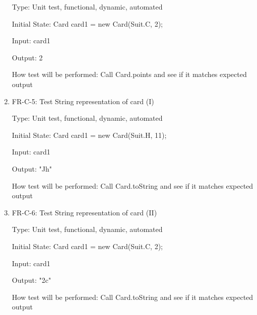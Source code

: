 \documentclass[12pt, titlepage]{article}
\begin{document}
\begin{enumerate}
    Type: Unit test, functional, dynamic, automated
    					
    Initial State: Card card1 = new Card(Suit.C, 2);
    					
    Input: card1
    					
    Output: 2
    					
    How test will be performed: Call Card.points and see if it matches expected output
    
    \item{FR-C-5: Test String representation of card (I)\\}
    
    Type: Unit test, functional, dynamic, automated
    					
    Initial State: Card card1 = new Card(Suit.H, 11);
    					
    Input: card1
    					
    Output: "Jh"
    					
    How test will be performed: Call Card.toString and see if it matches expected output
    
    \item{FR-C-6: Test String representation of card (II)\\}
    
    Type: Unit test, functional, dynamic, automated
    					
    Initial State: Card card1 = new Card(Suit.C, 2);
    					
    Input: card1
    					
    Output: "2c"
    					
    How test will be performed: Call Card.toString and see if it matches expected output

\end{enumerate}
\end{document}
